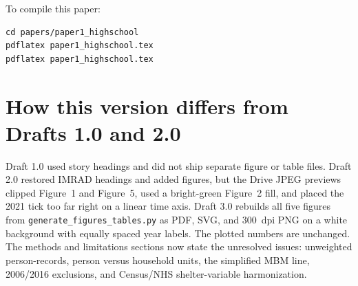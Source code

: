 \documentclass[11pt,letterpaper]{article}
\begin{document}
To compile this paper:

\begin{verbatim}
cd papers/paper1_highschool
pdflatex paper1_highschool.tex
pdflatex paper1_highschool.tex
\end{verbatim}

\section{How this version differs from Drafts 1.0 and 2.0}
\label{app:diff}

Draft 1.0 used story headings and did not ship separate figure or table files.
Draft 2.0 restored IMRAD headings and added figures, but the Drive JPEG previews clipped Figure~1 and Figure~5, used a bright-green Figure~2 fill, and placed the 2021 tick too far right on a linear time axis.
Draft 3.0 rebuilds all five figures from \texttt{generate\_figures\_tables.py} as PDF, SVG, and 300~dpi PNG on a white background with equally spaced year labels.
The plotted numbers are unchanged.
The methods and limitations sections now state the unresolved issues: unweighted person-records, person versus household units, the simplified MBM line, 2006/2016 exclusions, and Census/NHS shelter-variable harmonization.
\end{document}
